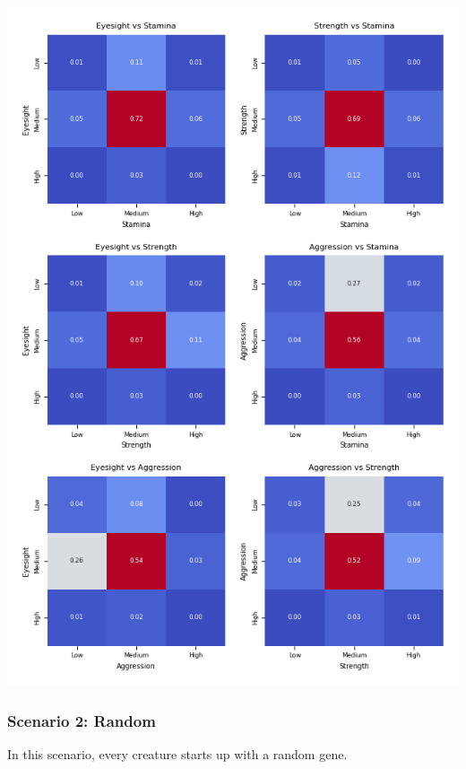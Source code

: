 \documentclass{article}
\begin{document}
\begin{center}
    \includegraphics[scale=0.9]{tests/9_confusion_matrices.png}
\end{center}
\subsubsection{Scenario 2: Random}

In this scenario, every creature starts up with a random gene.
\end{document}
